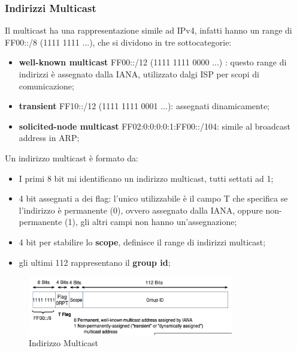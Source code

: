 \documentclass[12pt]{article}
\begin{document}
\subsubsection{Indirizzi Multicast}
Il multicast ha una rappresentazione simile ad IPv4, infatti hanno un range di FF00::/8 (1111 1111 ...), che si dividono in tre sottocategorie:
\begin{itemize}
    \item \textbf{well-known multicast} FF00::/12 (1111 1111 0000 ...) : questo range di indirizzi \`e assegnato dalla IANA, utilizzato dalgi ISP per scopi di comunicazione;
    \item \textbf{transient} FF10::/12 (1111 1111 0001 ...): assegnati dinamicamente;
    \item \textbf{solicited-node multicast} FF02:0:0:0:0:1:FF00::/104: simile al broadcast address in ARP;
\end{itemize}
Un indirizzo multicast \`e formato da:
\begin{itemize}
    \item I primi 8 bit mi identificano un indirizzo multicast, tutti settati ad 1;
    \item 4 bit assegnati a dei flag: l'unico utilizzabile \`e il campo T che specifica se l'indirizzo \`e permanente (0), ovvero assegnato dalla IANA, oppure non-permanente (1), gli altri campi non hanno un'assegnazione;
    \item 4 bit per stabilire lo \textbf{scope}, definisce il range di indirizzi multicast;
    \item gli ultimi 112 rappresentano il \textbf{group id};    
\end{itemize}
\begin{figure}[H]
    \centering
    \includegraphics[width=0.8\textwidth]{indirizzo-multicast.png}
    \caption{Indirizzo Multicast}
    \label{fig:indirizzo-multicast}
\end{figure}
\end{document}
